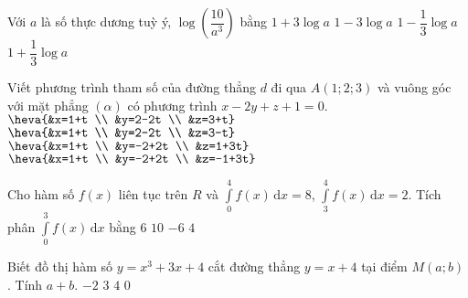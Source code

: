 \begin{ex}%
	Với $a$ là số thực dương tuỳ ý, $\log \left(\dfrac{10}{a^3}\right)$ bằng
	\choice
	{$1+3\log a$}
	{\True $1-3\log a$}
	{$1-\dfrac{1}{3}\log a$}
	{$1+\dfrac{1}{3}\log a$}
\end{ex}


\begin{ex}%
	Viết phương trình tham số của đường thẳng $d$ đi qua $A(1;2;3)$ và vuông góc với mặt phẳng $(\alpha)$ có phương trình $x-2y+z+1=0$.
	\choice
	{\True $\heva{&x=1+t \\ &y=2-2t \\ &z=3+t}$}
	{$\heva{&x=1+t \\ &y=2-2t \\ &z=3-t}$}
	{$\heva{&x=1+t \\ &y=-2+2t \\ &z=1+3t}$}
	{$\heva{&x=1+t \\ &y=-2+2t \\ &z=-1+3t}$}
\end{ex}


\begin{ex}%
	Cho hàm số $f(x)$ liên tục trên $R$ và $\displaystyle\int\limits_0^4f(x) \mathrm{\,d}x=8$, $\displaystyle\int\limits_3^4f(x) \mathrm{\,d}x=2$. Tích phân $\displaystyle\int\limits_0^3f(x) \mathrm{\,d}x$ bằng
	\choice
	{\True $6$}
	{$10$}
	{$-6$}
	{$4$}
\end{ex}


\begin{ex}%
	Biết đồ thị hàm số $y=x^3+3x+4$ cắt đường thẳng $y=x+4$ tại điểm $M(a;b)$. Tính $a+b$.
	\choice
	{$-2$}
	{$3$}
	{\True $4$}
	{$0$}
\end{ex}


